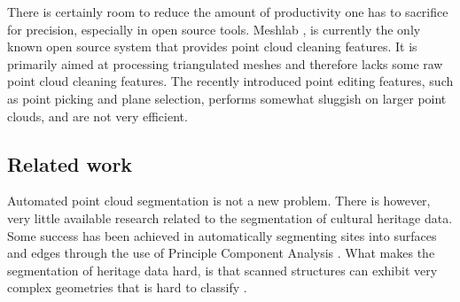 \documentclass[10pt,twocolumn]{article}
\begin{document}
There is certainly room to reduce the amount of productivity one has to sacrifice for precision, especially in open source tools. Meshlab \cite{VisualComputingLaboratory2012}, is currently the only known open source system that provides point cloud cleaning features. It is primarily aimed at processing triangulated meshes and therefore lacks some raw point cloud cleaning features. The recently introduced point editing features, such as point picking and plane selection, performs somewhat sluggish on larger point clouds, and are not very efficient.





\subsection{Related work}

 Automated point cloud segmentation is not a new problem. There is however, very little available research related to the segmentation of cultural heritage data. Some success has been achieved in automatically segmenting sites into surfaces and edges through the use of Principle Component Analysis \cite{Spina2010}. What makes the segmentation of heritage data hard, is that scanned structures can exhibit very complex geometries that is hard to classify \cite{Spina2010}.




\end{document}
